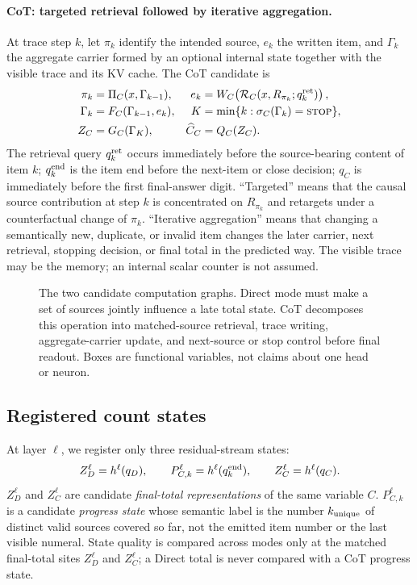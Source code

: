 \paragraph{CoT: targeted retrieval followed by iterative aggregation.}
At trace step \(k\), let \(\pi_k\) identify the intended source, \(e_k\) the written item, and \(\Gamma_k\) the aggregate carrier formed by an optional internal state together with the visible trace and its KV cache. The CoT candidate is
\begin{align}
\pi_k &= \Pi_C(x,\Gamma_{k-1}),
&
e_k &= W_C\!\left(\mathcal R_C(x,R_{\pi_k};q_k^{\rm ret})\right),\\
\Gamma_k &= F_C(\Gamma_{k-1},e_k),
&
K &= \min\{k:\sigma_C(\Gamma_k)=\textsc{stop}\},\\
Z_C &= G_C(\Gamma_K),
&
\widehat C_C &= Q_C(Z_C).
\label{eq:cot-mechanism}
\end{align}
The retrieval query \(q_k^{\rm ret}\) occurs immediately before the source-bearing content of item \(k\); \(q_k^{\rm end}\) is the item end before the next-item or close decision; \(q_C\) is immediately before the first final-answer digit. ``Targeted'' means that the causal source contribution at step \(k\) is concentrated on \(R_{\pi_k}\) and retargets under a counterfactual change of \(\pi_k\). ``Iterative aggregation'' means that changing a semantically new, duplicate, or invalid item changes the later carrier, next retrieval, stopping decision, or final total in the predicted way. The visible trace may be the memory; an internal scalar counter is not assumed.

\begin{figure}[H]
\centering
\resizebox{\textwidth}{!}{}
\caption{The two candidate computation graphs. Direct mode must make a set of sources jointly influence a late total state. CoT decomposes this operation into matched-source retrieval, trace writing, aggregate-carrier update, and next-source or stop control before final readout. Boxes are functional variables, not claims about one head or neuron.}
\label{fig:overview}
\end{figure}

\subsection{Registered count states}

At layer \(\ell\), we register only three residual-stream states:
\begin{equation}
Z_D^\ell=h^\ell(q_D),
\qquad
P_{C,k}^\ell=h^\ell(q_k^{\rm end}),
\qquad
Z_C^\ell=h^\ell(q_C).
\label{eq:registered-states}
\end{equation}
\(Z_D^\ell\) and \(Z_C^\ell\) are candidate \emph{final-total representations} of the same variable \(C\). \(P_{C,k}^\ell\) is a candidate \emph{progress state} whose semantic label is the number \(k_{\rm unique}\) of distinct valid sources covered so far, not the emitted item number or the last visible numeral. State quality is compared across modes only at the matched final-total sites \(Z_D^\ell\) and \(Z_C^\ell\); a Direct total is never compared with a CoT progress state.

